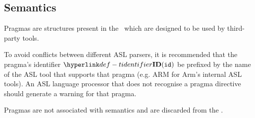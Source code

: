 \FormallyParagraph
\begin{mathpar}
\end{mathpar}

\subsection{Semantics\label{sec:PragmaSemantics}}

\ProseParagraph
Pragmas are structures present in the \untypedast \ which are designed to be used
by third-party tools.

To avoid conflicts between different ASL parsers, it is recommended that the pragma's identifier $\Tidentifier(\id)$ be prefixed by the name of the ASL tool that supports that pragma
(e.g. ARM for Arm's internal ASL tools). An ASL language processor that does not recognise a pragma directive should generate a warning for that pragma.

Pragmas are not associated with semantics and are discarded from the \typedast.
